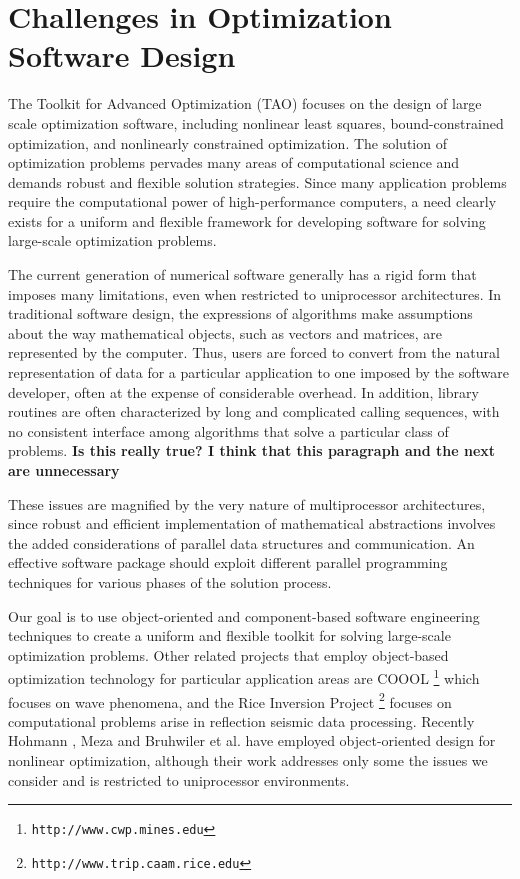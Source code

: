\section{Challenges in Optimization Software Design}

\setcounter{footnote}{0}
\renewcommand{\thefootnote}{\arabic{footnote}}

The Toolkit for Advanced Optimization (TAO) focuses on the design of large
scale optimization software, including nonlinear least
squares,  bound-constrained
optimization, and nonlinearly constrained optimization.
The solution of optimization problems
pervades many areas of computational science and demands robust and
flexible solution strategies.
Since many application problems require the computational
power of high-performance computers, a need clearly exists for a
uniform and flexible
framework for developing software for solving large-scale
optimization problems.

The current generation of numerical software generally has a rigid form
that imposes many limitations, even when restricted to
uniprocessor architectures.
In traditional software design, the expressions of
algorithms make assumptions about the way mathematical objects, such as
vectors and matrices, are represented by the computer.
Thus, users are
forced to convert from the natural representation of data for a particular
application to one imposed by the software developer, often at the
expense of considerable overhead.  In addition, library routines are
often characterized by long and complicated calling sequences, with
no consistent interface among algorithms that solve a particular class
of problems.
\textbf{Is this really true? I think that this paragraph
and the next are unnecessary}

These issues are magnified by the very nature of multiprocessor
architectures, since robust and
efficient implementation of mathematical abstractions involves
the added considerations
of parallel data structures and communication.
An effective software package should
exploit different parallel programming
techniques for various phases of the solution process.

Our goal is to use object-oriented and component-based
software engineering techniques to create  a
uniform and flexible toolkit for solving large-scale
optimization problems.
Other related projects that employ 
object-based optimization technology for
particular application areas are 
COOOL%
\footnote{\texttt{http://www.cwp.mines.edu}}
which focuses on wave phenomena,
and the 
Rice Inversion Project%
\footnote{\texttt{http://www.trip.caam.rice.edu}}
focuses on computational
problems arise in reflection seismic data processing.
Recently Hohmann \cite{hohmann:94}, Meza \cite{meza:94}
and Bruhwiler et al. \cite{bsca98} have employed object-oriented design
for nonlinear optimization, although their work addresses only some
the issues we consider and is restricted to uniprocessor environments.


